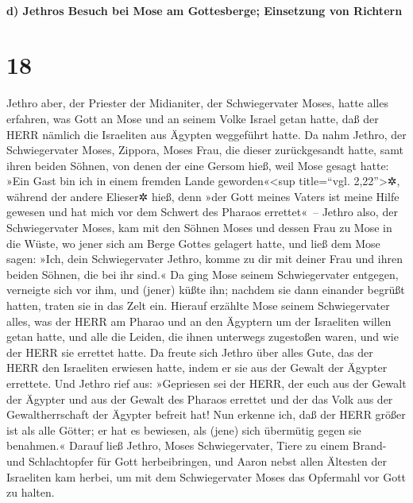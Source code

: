 \hypertarget{d-jethros-besuch-bei-mose-am-gottesberge-einsetzung-von-richtern}{%
\paragraph{d) Jethros Besuch bei Mose am Gottesberge; Einsetzung von
Richtern}\label{d-jethros-besuch-bei-mose-am-gottesberge-einsetzung-von-richtern}}

\hypertarget{section-17}{%
\section{18}\label{section-17}}

 Jethro aber, der Priester der Midianiter, der
Schwiegervater Moses, hatte alles erfahren, was Gott an Mose und an
seinem Volke Israel getan hatte, daß der HERR nämlich die Israeliten aus
Ägypten weggeführt hatte.  Da nahm Jethro, der
Schwiegervater Moses, Zippora, Moses Frau, die dieser zurückgesandt
hatte,  samt ihren beiden Söhnen, von denen der eine
Gersom hieß, weil Mose gesagt hatte: »Ein Gast bin ich in einem fremden
Lande geworden«\textless sup title=``vgl. 2,22''\textgreater✲,
 während der andere Elieser✲ hieß, denn »der Gott meines
Vaters ist meine Hilfe gewesen und hat mich vor dem Schwert des Pharaos
errettet«~--  Jethro also, der Schwiegervater Moses, kam
mit den Söhnen Moses und dessen Frau zu Mose in die Wüste, wo jener sich
am Berge Gottes gelagert hatte,  und ließ dem Mose sagen:
»Ich, dein Schwiegervater Jethro, komme zu dir mit deiner Frau und ihren
beiden Söhnen, die bei ihr sind.«  Da ging Mose seinem
Schwiegervater entgegen, verneigte sich vor ihm, und (jener) küßte ihn;
nachdem sie dann einander begrüßt hatten, traten sie in das Zelt ein.
 Hierauf erzählte Mose seinem Schwiegervater alles, was
der HERR am Pharao und an den Ägyptern um der Israeliten willen getan
hatte, und alle die Leiden, die ihnen unterwegs zugestoßen waren, und
wie der HERR sie errettet hatte.  Da freute sich Jethro
über alles Gute, das der HERR den Israeliten erwiesen hatte, indem er
sie aus der Gewalt der Ägypter errettete.  Und Jethro
rief aus: »Gepriesen sei der HERR, der euch aus der Gewalt der Ägypter
und aus der Gewalt des Pharaos errettet und der das Volk aus der
Gewaltherrschaft der Ägypter befreit hat!  Nun erkenne
ich, daß der HERR größer ist als alle Götter; er hat es bewiesen, als
(jene) sich übermütig gegen sie benahmen.«  Darauf ließ
Jethro, Moses Schwiegervater, Tiere zu einem Brand- und Schlachtopfer
für Gott herbeibringen, und Aaron nebst allen Ältesten der Israeliten
kam herbei, um mit dem Schwiegervater Moses das Opfermahl vor Gott zu
halten.

